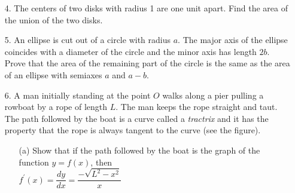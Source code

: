 \documentclass{sebase}
\begin{document}
\begin{enumerate}
\item[4.] The centers of two disks with radius 1 are one unit apart. Find
the area of the union of the two disks.

%

\item[5.] An ellipse is cut out of a circle with radius $a$. The major axis
of the ellipse coincides with a diameter of the circle and the minor axis
has length $2b$. Prove that the area of the remaining part of the circle is
the same as the area of an ellipse with semiaxes $a$ and $a-b$.

%

%

\item[6.] 
A man initially standing at the point $O$ walks along a pier
pulling a rowboat by a rope of length $L$. The man keeps the rope straight
and taut. The path followed by the boat is a curve called a \textit{tractrix}
and it has the property that the rope is always tangent to the curve (see
the figure).

\begin{enumerate}
\item[(a)] Show that if the path followed by the boat is the graph of the
function $y=f(x)$, then \\[4pt]
\hspace*{\fill}$f^{\prime }(x)=\dfrac{dy}{dx}=\dfrac{-\sqrt{L^{2}-x^{2}}}{x}$%
\hspace*{\fill}

%


\end{enumerate}
\end{enumerate}
\end{document}
